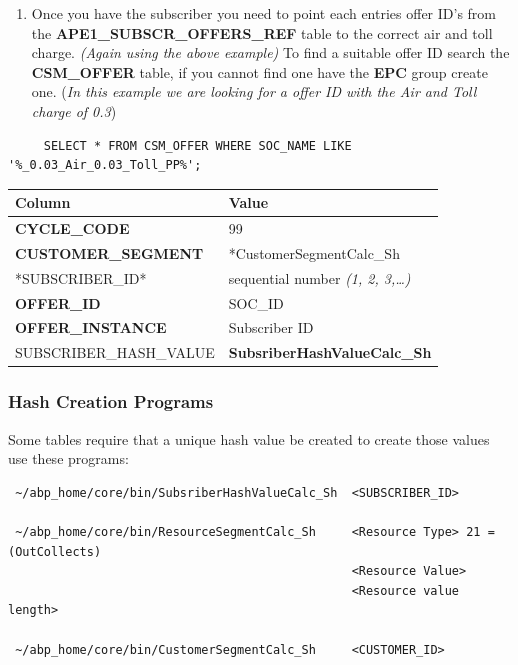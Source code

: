 \documentclass[12pt,twoside]{article}
\begin{document}
   \normalsize
\begin{enumerate}
\item Once you have the subscriber you need to point each entries offer ID's from 
       the \textbf{APE1\_SUBSCR\_OFFERS\_REF} table to the correct air and toll charge. \emph{(Again using the above example)}
       To find a suitable offer ID search the \textbf{CSM\_OFFER} table, if you cannot find one have the \textbf{EPC} group create one. (\emph{In this example we are looking for a offer ID with the Air and Toll charge of 0.3})
\end{enumerate}
\begin{verbatim}
     SELECT * FROM CSM_OFFER WHERE SOC_NAME LIKE '%_0.03_Air_0.03_Toll_PP%';
\end{verbatim}
   \footnotesize

\begin{center}
\begin{tabular}{ll}
\hline
 \textbf{Column}             &  \textbf{Value}                        \\
\hline
 \textbf{CYCLE\_CODE}        &  99                                    \\
 \textbf{CUSTOMER\_SEGMENT}  &  *CustomerSegmentCalc\_Sh              \\
 *SUBSCRIBER\_ID*            &  sequential number \emph{(1, 2, 3,…)}  \\
 \textbf{OFFER\_ID}          &  SOC\_ID                               \\
 \textbf{OFFER\_INSTANCE}    &  Subscriber ID                         \\
 SUBSCRIBER\_HASH\_VALUE     &  \textbf{SubsriberHashValueCalc\_Sh}   \\
\hline
\end{tabular}
\end{center}


   \normalsize
\subsubsection{Hash Creation Programs}
\label{sec-9-16-3}

   Some tables require that a unique hash value be created to create those values use these programs:
\begin{verbatim}
 ~/abp_home/core/bin/SubsriberHashValueCalc_Sh  <SUBSCRIBER_ID>

 ~/abp_home/core/bin/ResourceSegmentCalc_Sh     <Resource Type> 21 = (OutCollects)
                                                <Resource Value> 
                                                <Resource value length>

 ~/abp_home/core/bin/CustomerSegmentCalc_Sh     <CUSTOMER_ID>
\end{verbatim}
\end{document}
